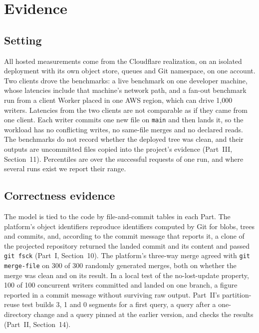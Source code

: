 \documentclass[11pt,letterpaper]{article}
\theoremstyle{definition}
\theoremstyle{remark}
\begin{document}
\section{Evidence}
\label{sec:syn:evidence}

\subsection{Setting}

All hosted measurements come from the Cloudflare realization, on an isolated deployment with its own object store, queues and Git namespace, on one account. Two clients drove the benchmarks: a live benchmark on one developer machine, whose latencies include that machine's network path, and a fan-out benchmark run from a client Worker placed in one AWS region, which can drive 1,000 writers. %
Latencies from the two clients are not comparable as if they came from one client. Each writer commits one new file on \texttt{main} and then lands it, so the workload has no conflicting writes, no same-file merges and no declared reads. The benchmarks do not record whether the deployed tree was clean, and their outputs are uncommitted files copied into the project's evidence (Part~III, Section~11). Percentiles are over the successful requests of one run, and where several runs exist we report their range.

\subsection{Correctness evidence}

The model is tied to the code by file-and-commit tables in each Part. The platform's object identifiers reproduce identifiers computed by Git for blobs, trees and commits, and, according to the commit message that reports it, a clone of the projected repository returned the landed commit and its content and passed \texttt{git fsck} (Part~I, Section~10). %
The platform's three-way merge agreed with \texttt{git merge-file} on 300 of 300 randomly generated merges, both on whether the merge was clean and on its result. %
In a local test of the no-lost-update property, 100 of 100 concurrent writers committed and landed on one branch, a figure reported in a commit message without surviving raw output. %
Part~II's partition-reuse test builds 3, 1 and 0 segments for a first query, a query after a one-directory change and a query pinned at the earlier version, and checks the results (Part~II, Section~14). %
\end{document}
